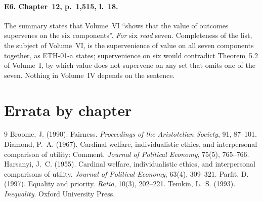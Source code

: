 \documentclass{situationist-preprint}
\begin{document}
\paragraph{E6. Chapter~12, p.~1,515, l.~18.} The summary states that Volume~VI \enquote{shows that the value of outcomes supervenes on the six components}. \textit{For} six \textit{read} seven. Completeness of the list, the subject of Volume~VI, is the supervenience of value on all seven components together, as ETH-01-a states; supervenience on six would contradict Theorem~5.2 of Volume~I, by which value does not supervene on any set that omits one of the seven. Nothing in Volume~IV depends on the sentence.

\section{Errata by chapter}\label{s:list}


\begin{thebibliography}{9}\small
{} Broome, J. (1990). Fairness. \emph{Proceedings of the Aristotelian Society}, 91, 87--101.
 Diamond, P.~A. (1967). Cardinal welfare, individualistic ethics, and interpersonal comparison of utility: Comment. \emph{Journal of Political Economy}, 75(5), 765--766.
 Harsanyi, J.~C. (1955). Cardinal welfare, individualistic ethics, and interpersonal comparisons of utility. \emph{Journal of Political Economy}, 63(4), 309--321.
 Parfit, D. (1997). Equality and priority. \emph{Ratio}, 10(3), 202--221.
 Temkin, L.~S. (1993). \emph{Inequality}. Oxford University Press.
\end{thebibliography}
\end{document}
